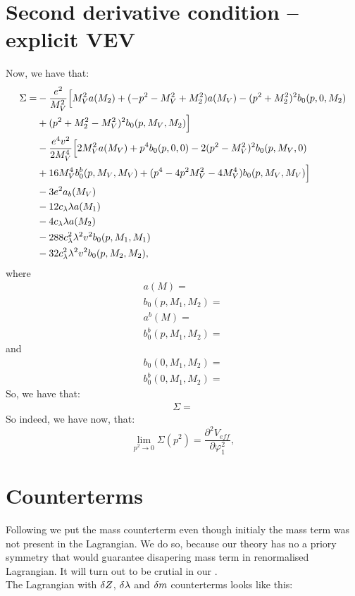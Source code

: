 \section{Second derivative condition -- explicit VEV}\label{sdcworks}
Now, we have that:
\begin{align}
\Sigma = &-\frac{e^2}{M_V^2}\Big[M_V^2a(M_2)+(-p^2-M_V^2+M_2^2)a(M_V)-(p^2+M_2^2)^2b_0(p,0,M_2) 
\notag\\ 
&+(p^2+M_2^2-M_V^2)^2b_0(p,M_V,M_2)\Big] \notag \\
&-\frac{e^4v^2}{2M_V^4}\Big[2M_V^2a(M_V)+p^4b_0(p,0,0)-2(p^2-M_V^2)^2b_0(p,M_V,0)\notag \\
&+16M_V^4b_0^b(p,M_V,M_V)+(p^4-4p^2M_V^2-4M_V^4)b_0(p,M_V,M_V)\Big] \notag \\
&-3e^2a_b(M_V) \notag\\
&-12c_\lambda\lambda a(M_1)\notag \\
&-4c_\lambda\lambda a(M_2)\notag \\
&-288c_\lambda^2\lambda^2v^2b_0(p,M_1,M_1)\notag \\
&-32c_\lambda^2\lambda^2 v^2b_0(p,M_2,M_2),
\end{align}
where
\begin{align}
a(M) = \\
b_0(p,M_1,M_2) = \\
a^b(M) = \\
b_0^b(p,M_1,M_2) = 
\end{align}
and
\begin{align}
b_0(0,M_1,M_2) = \\
b_0^b(0,M_1,M_2) = 
\end{align}
So, we have that:
\begin{align}
\Sigma = 
\end{align}
So indeed, we have now, that:
\begin{equation}\label{second_derivativ_condition}
\lim\limits_{p^2\to 0}\Sigma(p^2)=\frac{\partial^2V_{eff}}{\partial\varphi_1^2},
\end{equation}
\section{Counterterms}
Following \cite{Coleman1973} we put the mass counterterm even though initialy the mass term 
was not present in the Lagrangian. We do so, because our theory has no a priory symmetry 
that would guarantee disapering mass term in renormalised Lagrangian. It will turn out to be 
crutial in our . \\ 
The Lagrangian with $\delta Z$, $\delta\lambda$ and $\delta m$ counterterms looks like this:

